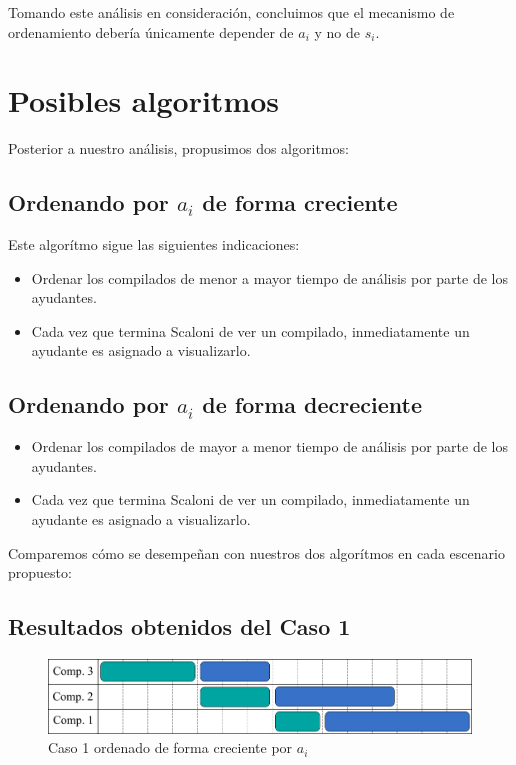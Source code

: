 Tomando este análisis en consideración, concluimos que el mecanismo de ordenamiento debería únicamente depender
de $a_i$ y no de $s_i$.

\section{Posibles algoritmos}

Posterior a nuestro análisis, propusimos dos algoritmos:

\subsection{Ordenando por $a_i$ de forma creciente}
Este algorítmo sigue las siguientes indicaciones:
\begin{itemize}
    \item Ordenar los compilados de menor a mayor tiempo de análisis por parte de los ayudantes.
    \item Cada vez que termina Scaloni de ver un compilado, inmediatamente un ayudante es asignado a visualizarlo.
\end{itemize}

\subsection{Ordenando por $a_i$ de forma decreciente}
\begin{itemize}
    \item Ordenar los compilados de mayor a menor tiempo de análisis por parte de los ayudantes.
    \item Cada vez que termina Scaloni de ver un compilado, inmediatamente un ayudante es asignado a visualizarlo.
\end{itemize}

Comparemos cómo se desempeñan con nuestros dos algorítmos en cada escenario propuesto:

\subsection{Resultados obtenidos del Caso 1}

\begin{figure}[H]
    \centering
    \includegraphics[width=1\textwidth]{img/caso-1-creciente.png}
    \caption{Caso 1 ordenado de forma creciente por $a_i$}
    \label{fig:Caso 1 ordenado de forma creciente por $a_i$}
\end{figure}

